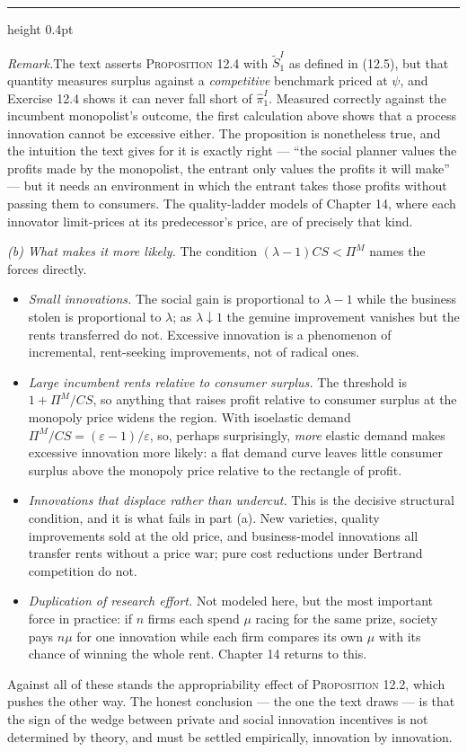 \documentclass[11pt,letterpaper,reqno]{amsart}
\makeatletter
\newcommand{\wh}[1]{\widehat{#1}}
\newcommand{\wt}[1]{\widetilde{#1}}
\newcommand{\as@head}[3]{%
  \par\addvspace{1.6ex}\penalty-200\relax
  \phantomsection
  \addcontentsline{toc}{subsection}{#1 #2\texorpdfstring{\ifx\relax#3\relax\else\quad #3\fi}{}}%
  {\color{RuleGrey}\hrule height 0.4pt}%
  \nobreak\vspace{0.8ex}\nobreak
  \noindent{\bfseries #1 #2}%
  \ifx\relax#3\relax\else\quad{\bfseries\itshape #3}\fi
  \par\nobreak\vspace{0.4ex}\nobreak
  \as@beginstatement
}
\newcommand{\as@beginstatement}{\begingroup\itshape\ignorespaces}
\newenvironment{aex}[2]{\as@head{Exercise}{#1}{#2}}{\par\addvspace{1.2ex}}
\newcommand{\rmk}[1]{%
  \par\vspace{0.6ex}%
  {\small\noindent\textit{Remark.}\hspace{0.5em}#1\par}%
  \vspace{0.4ex}%
}
\newcommand{\bk}[1]{\textup{\textsc{#1}}}
\renewcommand{\as@beginstatement}{\ignorespaces}
\makeatother
\begin{document}
\begin{aex}{12.8}{}
\rmk{The text asserts \bk{Proposition 12.4} with $\wt S^{I}_{1}$ as defined in \bk{(12.5)}, but
that quantity measures surplus against a \emph{competitive} benchmark priced at $\psi$, and
Exercise 12.4 shows it can never fall short of $\wh\pi^{I}_{1}$.  Measured correctly against the
incumbent monopolist's outcome, the first calculation above shows that a process innovation cannot
be excessive either.  The proposition is nonetheless true, and the intuition the text gives for it
is exactly right --- ``the social planner values the profits made by the monopolist, the entrant
only values the profits it will make'' --- but it needs an environment in which the entrant takes
those profits without passing them to consumers.  The quality-ladder models of Chapter 14, where
each innovator limit-prices at its predecessor's price, are of precisely that kind.}

\emph{(b) What makes it more likely.}  The condition $(\lambda-1)CS<\Pi^{M}$ names the forces
directly.
\begin{itemize}
\item \emph{Small innovations.}  The social gain is proportional to $\lambda-1$ while the business
      stolen is proportional to $\lambda$; as $\lambda\downarrow1$ the genuine improvement vanishes
      but the rents transferred do not.  Excessive innovation is a phenomenon of incremental,
      rent-seeking improvements, not of radical ones.
\item \emph{Large incumbent rents relative to consumer surplus.}  The threshold is
      $1+\Pi^{M}/CS$, so anything that raises profit relative to consumer surplus at the monopoly
      price widens the region.  With isoelastic demand $\Pi^{M}/CS=(\varepsilon-1)/\varepsilon$,
      so, perhaps surprisingly, \emph{more} elastic demand makes excessive innovation more likely:
      a flat demand curve leaves little consumer surplus above the monopoly price relative to the
      rectangle of profit.
\item \emph{Innovations that displace rather than undercut.}  This is the decisive structural
      condition, and it is what fails in part (a).  New varieties, quality improvements sold at the
      old price, and business-model innovations all transfer rents without a price war; pure cost
      reductions under Bertrand competition do not.
\item \emph{Duplication of research effort.}  Not modeled here, but the most important force in
      practice: if $n$ firms each spend $\mu$ racing for the same prize, society pays $n\mu$ for
      one innovation while each firm compares its own $\mu$ with its chance of winning the whole
      rent.  Chapter 14 returns to this.
\end{itemize}
Against all of these stands the appropriability effect of \bk{Proposition 12.2}, which pushes the
other way.  The honest conclusion --- the one the text draws --- is that the sign of the wedge
between private and social innovation incentives is not determined by theory, and must be settled
empirically, innovation by innovation.


\end{aex}
\end{document}

